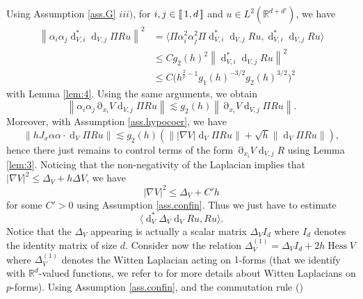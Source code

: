 \documentclass[12pt]{amsart}
\newcommand{\R}{\mathbb R}
\newcommand{\Hess}{\operatorname{Hess}}
\def\<{\langle}
\def\>{\rangle}
\renewcommand{\d}{\operatorname{d}}
\numberwithin{equation}{section}
\numberwithin{figure}{section}
\DeclareMathOperator{\p}{\partial}
\newcommand{\vvert}[1]{\left\lVert#1\right\rVert}
\newcommand{\lb}{\operatorname{[\negthinspace [}}
\newcommand{\rb}{\operatorname{]\negthinspace ]}}
\begin{document}
Using Assumption \ref{ass.G} $iii)$, for $i,j\in\lb1,d\rb$ and $u\in L^2(\R^{d+d'})$, we have
\begin{equation*}
\begin{aligned}
    \vvert{\alpha_i\alpha_j\d_{V,i}^*\d_{V,j}\Pi Ru}^2 &= \<\Pi \alpha_i^2\alpha_j^2\Pi\d_{V,i}^*\d_{V,j}Ru,\d_{V,i}^*\d_{V,j}Ru\>\\
    &\leq Cg_2(h)^2\vvert{\d_{V,i}^*\d_{V,j}Ru}^2\\
    &\leq C\big(h^{\frac{2}{\overline{\nu}} - 1}g_1(h)^{-3/2}g_2(h)^{3/2}\big)^2
\end{aligned}
\end{equation*}
with Lemma \ref{lem:4}. Using the same arguments, we obtain
\begin{equation*}
\vvert{\alpha_i\alpha_j\p_{x_i}V\d_{V,j}\Pi Ru} \lesssim g_2(h)\vvert{\p_{x_i}V\d_{V,j}\Pi Ru}.
\end{equation*}
Moreover, with Assumption \ref{ass.hypocoer}, we have
\begin{equation*}
\vvert{hJ_x\alpha\alpha\cdot\d_V\Pi Ru} \lesssim g_2(h)(\vvert{|\nabla V|\d_V\Pi Ru} + \sqrt{h}\vvert{\d_V\Pi Ru}),
\end{equation*}
hence there just remains to control terms of the form $\p_{x_i}V\d_{V,j}R$ using Lemma \ref{lem:3}. Noticing that the non-negativity of the Laplacian %
implies that $|\nabla V|^2\leq \Delta_V + h\Delta V$, we have
\begin{equation}\label{eq:nablaVleqDeltaV}
|\nabla V|^2\leq\Delta_V + C'h
\end{equation}
for %
some $C'>0$ using Assumption \ref{ass.confin}. Thus we just have to estimate
\begin{equation*}
\<\d_V^*\Delta_V\d_VRu,Ru\>.
\end{equation*}
Notice that the $\Delta_V$ appearing is actually a scalar matrix $\Delta_VI_d$ %
where $I_d$ denotes the identity matrix of size $d$. Consider now the relation $\Delta_V^{(1)} = \Delta_VI_d + 2h\Hess V$ where $\Delta_V^{(1)}$ denotes the Witten Laplacian acting on $1$-forms (that we identify with $\R^d$-valued functions, we refer to %
\cite{HeSj85_01} for more details about Witten Laplacians on $p$-forms). Using Assumption \ref{ass.confin}, and the commutation rule (\cite[(2.1)]{HeKlNi04_01})
\end{document}
